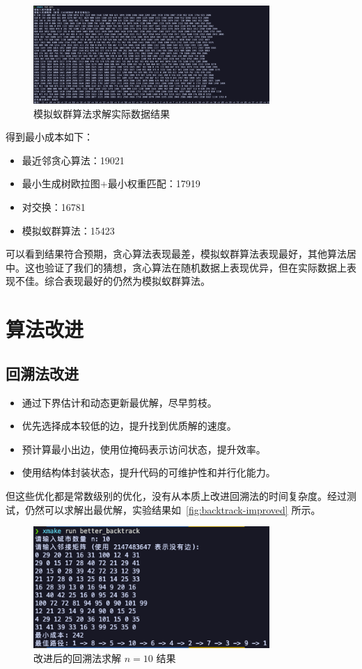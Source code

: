 \begin{figure}[htbp]
    \centering
    \includegraphics[width=0.8\textwidth]{images/aco_city.png}
    \caption{模拟蚁群算法求解实际数据结果}
    \label{fig:ant-city}
\end{figure}

得到最小成本如下：\begin{itemize}
    \item 最近邻贪心算法：19021
    \item 最小生成树欧拉图+最小权重匹配：17919
    \item 对交换：16781
    \item 模拟蚁群算法：15423
\end{itemize}

可以看到结果符合预期，贪心算法表现最差，模拟蚁群算法表现最好，其他算法居中。这也验证了我们的猜想，贪心算法在随机数据上表现优异，但在实际数据上表现不佳。综合表现最好的仍然为模拟蚁群算法。
\section{算法改进}

\subsection{回溯法改进}
\begin{itemize}
    \item 通过下界估计和动态更新最优解，尽早剪枝。
    \item 优先选择成本较低的边，提升找到优质解的速度。
    \item 预计算最小出边，使用位掩码表示访问状态，提升效率。
    \item 使用结构体封装状态，提升代码的可维护性和并行化能力。
\end{itemize}

但这些优化都是常数级别的优化，没有从本质上改进回溯法的时间复杂度。经过测试，仍然可以求解出最优解，实验结果如~\autoref{fig:backtrack-improved} 所示。
\begin{figure}[htbp]
    \centering
    \includegraphics[width=0.8\textwidth]{images/backtrack_improved.png}
    \caption{改进后的回溯法求解 $n=10$ 结果}
    \label{fig:backtrack-improved}
\end{figure}

